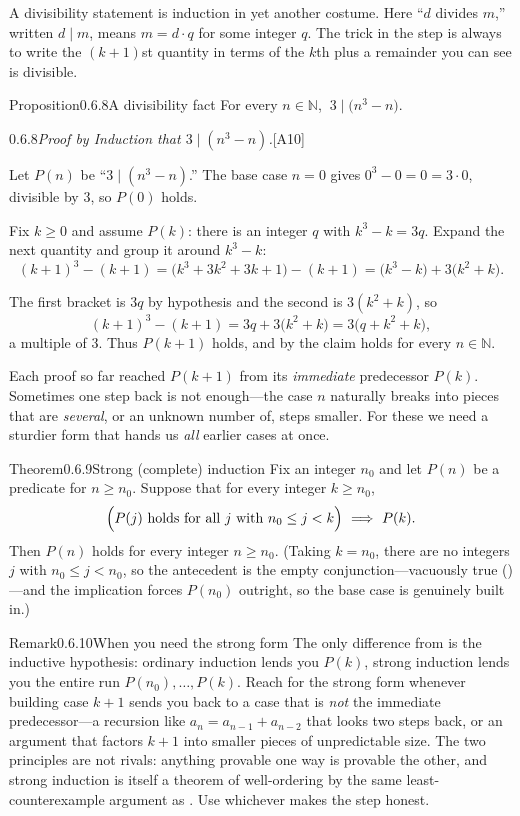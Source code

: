 \documentclass[main.tex]{subfiles}
\begin{document}
\noindent A divisibility statement is induction in yet another costume. Here ``$d$ divides $m$,''
written $d\mid m$, means $m=d\cdot q$ for some integer $q$. The trick in the step is always to write
the $(k+1)$st quantity in terms of the $k$th plus a remainder you can see is divisible.

\begin{Obj}{Proposition}{0.6.8}{A divisibility fact}
For every $n\in\mathbb N$, $\ 3\mid\bigl(n^3-n\bigr)$.
\end{Obj}

\begin{Prf}{0.6.8}{\itshape Proof by Induction that $3\mid(n^3-n)$.}{[A10]}
\item Let $P(n)$ be ``$3\mid(n^3-n)$.'' The base case $n=0$ gives $0^3-0=0=3\cdot 0$, divisible by
$3$, so $P(0)$ holds.
\item Fix $k\ge 0$ and assume $P(k)$: there is an integer $q$ with $k^3-k=3q$. Expand the next
quantity and group it around $k^3-k$:
\[
(k+1)^3-(k+1)=\bigl(k^3+3k^2+3k+1\bigr)-(k+1)=\bigl(k^3-k\bigr)+3\bigl(k^2+k\bigr).
\]
\item The first bracket is $3q$ by hypothesis and the second is $3(k^2+k)$, so
\[
(k+1)^3-(k+1)=3q+3\bigl(k^2+k\bigr)=3\bigl(q+k^2+k\bigr),
\]
a multiple of $3$. Thus $P(k+1)$ holds, and by  the claim holds for every $n\in\mathbb N$.
\end{Prf}

\noindent Each proof so far reached $P(k+1)$ from its \emph{immediate} predecessor $P(k)$. Sometimes
one step back is not enough---the case $n$ naturally breaks into pieces that are \emph{several}, or an
unknown number of, steps smaller. For these we need a sturdier form that hands us \emph{all} earlier
cases at once.

\begin{Obj}{Theorem}{0.6.9}{Strong (complete) induction}
Fix an integer $n_0$ and let $P(n)$ be a predicate for $n\ge n_0$. Suppose that for every integer
$k\ge n_0$,
\[
\Bigl(P(j)\ \text{holds for all $j$ with}\ n_0\le j<k\Bigr)\ \Longrightarrow\ P(k).
\]
Then $P(n)$ holds for every integer $n\ge n_0$. (Taking $k=n_0$, there are no integers $j$ with
$n_0\le j<n_0$, so the antecedent is the empty conjunction---vacuously true ()---and the
implication forces $P(n_0)$ outright, so the base case is genuinely built in.)
\end{Obj}

\begin{ObjL}{Remark}{0.6.10}{When you need the strong form}
The only difference from  is the inductive hypothesis: ordinary induction lends you
$P(k)$, strong induction lends you the entire run $P(n_0),\dots,P(k)$. Reach for the strong form
whenever building case $k+1$ sends you back to a case that is \emph{not} the immediate predecessor---a
recursion like $a_{n}=a_{n-1}+a_{n-2}$ that looks two steps back, or an argument that factors $k+1$
into smaller pieces of unpredictable size. The two principles are not rivals: anything provable one
way is provable the other, and strong induction is itself a theorem of well-ordering by the same
least-counterexample argument as . Use whichever makes the step honest.
\end{ObjL}
\end{document}
